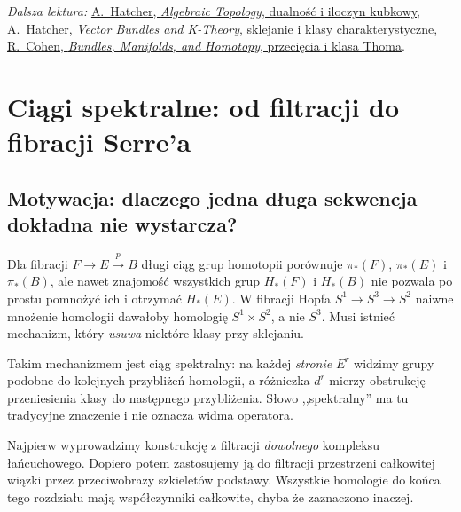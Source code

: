 \documentclass[11pt,a4paper,oneside]{report}
\theoremstyle{plain}
\theoremstyle{definition}
\theoremstyle{remark}
\begin{document}
\par\smallskip
{\footnotesize\noindent\emph{Dalsza lektura:}
\href{https://pi.math.cornell.edu/~hatcher/AT/AT.pdf}{A.\ Hatcher, \emph{Algebraic Topology}, dualność i iloczyn kubkowy},
\href{https://pi.math.cornell.edu/~hatcher/VBKT/VB.pdf}{A.\ Hatcher, \emph{Vector Bundles and K-Theory}, sklejanie i klasy charakterystyczne},
\href{https://math.stanford.edu/~ralph/bookR4.pdf}{R.\ Cohen, \emph{Bundles, Manifolds, and Homotopy}, przecięcia i klasa Thoma}.\par}


\chapter{Ciągi spektralne: od filtracji do fibracji Serre'a}
\label{ch:ciagi-spektralne-v5}

\section{Motywacja: dlaczego jedna długa sekwencja dokładna nie wystarcza?}
Dla fibracji $F\to E\xrightarrow{p}B$ długi ciąg grup homotopii
porównuje $\pi_*(F)$, $\pi_*(E)$ i $\pi_*(B)$, ale nawet
znajomość wszystkich grup $H_*(F)$ i $H_*(B)$ nie pozwala po prostu
pomnożyć ich i otrzymać $H_*(E)$. W fibracji Hopfa
$S^1\to S^3\to S^2$ naiwne mnożenie homologii dawałoby
homologię $S^1\times S^2$, a nie $S^3$. Musi istnieć
mechanizm, który \emph{usuwa} niektóre klasy przy sklejaniu.

Takim mechanizmem jest ciąg spektralny: na każdej \emph{stronie}
$E^r$ widzimy grupy podobne do kolejnych przybliżeń homologii,
a różniczka $d^r$ mierzy obstrukcję przeniesienia klasy do
następnego przybliżenia. Słowo ,,spektralny'' ma tu tradycyjne
znaczenie i nie oznacza widma operatora.

Najpierw wyprowadzimy konstrukcję z filtracji \emph{dowolnego}
kompleksu łańcuchowego. Dopiero potem zastosujemy ją do
filtracji przestrzeni całkowitej wiązki przez przeciwobrazy
szkieletów podstawy. Wszystkie homologie do końca tego rozdziału
mają współczynniki całkowite, chyba że zaznaczono inaczej.
\end{document}
